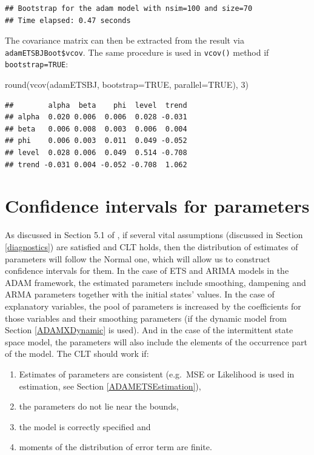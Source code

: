 \documentclass[
]{book}
\newenvironment{Shaded}{\begin{snugshade}}{\end{snugshade}}
\newcommand{\AttributeTok}[1]{\textcolor[rgb]{0.77,0.63,0.00}{#1}}
\newcommand{\ConstantTok}[1]{\textcolor[rgb]{0.00,0.00,0.00}{#1}}
\newcommand{\DecValTok}[1]{\textcolor[rgb]{0.00,0.00,0.81}{#1}}
\newcommand{\FunctionTok}[1]{\textcolor[rgb]{0.00,0.00,0.00}{#1}}
\newcommand{\NormalTok}[1]{#1}
\providecommand{\tightlist}{%
  \setlength{\itemsep}{0pt}\setlength{\parskip}{0pt}}
\theoremstyle{definition}
\theoremstyle{definition}
\theoremstyle{definition}
\theoremstyle{definition}
\theoremstyle{remark}
\begin{document}
\begin{verbatim}
## Bootstrap for the adam model with nsim=100 and size=70
## Time elapsed: 0.47 seconds
\end{verbatim}

The covariance matrix can then be extracted from the result via \texttt{adamETSBJBoot\$vcov}. The same procedure is used in \texttt{vcov()} method if \texttt{bootstrap=TRUE}:

\begin{Shaded}
\begin{Highlighting}[]
\FunctionTok{round}\NormalTok{(}\FunctionTok{vcov}\NormalTok{(adamETSBJ, }\AttributeTok{bootstrap=}\ConstantTok{TRUE}\NormalTok{, }\AttributeTok{parallel=}\ConstantTok{TRUE}\NormalTok{), }\DecValTok{3}\NormalTok{)}
\end{Highlighting}
\end{Shaded}

\begin{verbatim}
##        alpha  beta    phi  level  trend
## alpha  0.020 0.006  0.006  0.028 -0.031
## beta   0.006 0.008  0.003  0.006  0.004
## phi    0.006 0.003  0.011  0.049 -0.052
## level  0.028 0.006  0.049  0.514 -0.708
## trend -0.031 0.004 -0.052 -0.708  1.062
\end{verbatim}

\hypertarget{confidence-intervals-for-parameters}{%
\section{Confidence intervals for parameters}\label{confidence-intervals-for-parameters}}

As discussed in Section 5.1 of \citet{SvetunkovSBA}, if several vital assumptions (discussed in Section \ref{diagnostics}) are satisfied and CLT holds, then the distribution of estimates of parameters will follow the Normal one, which will allow us to construct confidence intervals for them. In the case of ETS and ARIMA models in the ADAM framework, the estimated parameters include smoothing, dampening and ARMA parameters together with the initial states' values. In the case of explanatory variables, the pool of parameters is increased by the coefficients for those variables and their smoothing parameters (if the dynamic model from Section \ref{ADAMXDynamic} is used). And in the case of the intermittent state space model, the parameters will also include the elements of the occurrence part of the model. The CLT should work if:

\begin{enumerate}
\def\labelenumi{\arabic{enumi}.}
\tightlist
\item
  Estimates of parameters are consistent (e.g.~MSE or Likelihood is used in estimation, see Section \ref{ADAMETSEstimation}),
\item
  the parameters do not lie near the bounds,
\item
  the model is correctly specified and
\item
  moments of the distribution of error term are finite.
\end{enumerate}
\end{document}

